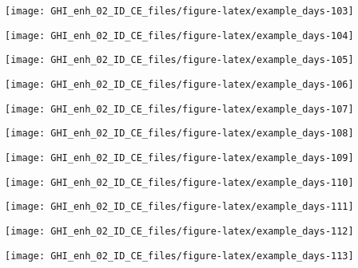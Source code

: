 \documentclass[
  10pt,
  a4paper,oneside]{article}
\begin{document}
\begin{center}\texttt{[image: GHI\_enh\_02\_ID\_CE\_files/figure-latex/example\_days-103]} \end{center}

\begin{center}\texttt{[image: GHI\_enh\_02\_ID\_CE\_files/figure-latex/example\_days-104]} \end{center}

\begin{center}\texttt{[image: GHI\_enh\_02\_ID\_CE\_files/figure-latex/example\_days-105]} \end{center}

\begin{center}\texttt{[image: GHI\_enh\_02\_ID\_CE\_files/figure-latex/example\_days-106]} \end{center}

\begin{center}\texttt{[image: GHI\_enh\_02\_ID\_CE\_files/figure-latex/example\_days-107]} \end{center}

\begin{center}\texttt{[image: GHI\_enh\_02\_ID\_CE\_files/figure-latex/example\_days-108]} \end{center}

\begin{center}\texttt{[image: GHI\_enh\_02\_ID\_CE\_files/figure-latex/example\_days-109]} \end{center}

\begin{center}\texttt{[image: GHI\_enh\_02\_ID\_CE\_files/figure-latex/example\_days-110]} \end{center}

\begin{center}\texttt{[image: GHI\_enh\_02\_ID\_CE\_files/figure-latex/example\_days-111]} \end{center}

\begin{center}\texttt{[image: GHI\_enh\_02\_ID\_CE\_files/figure-latex/example\_days-112]} \end{center}

\begin{center}\texttt{[image: GHI\_enh\_02\_ID\_CE\_files/figure-latex/example\_days-113]} \end{center}
\end{document}
